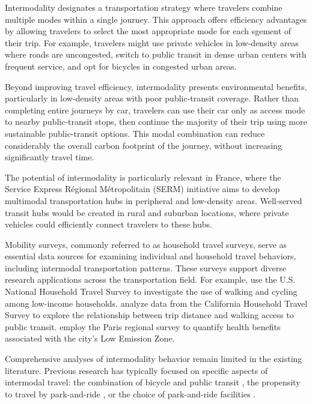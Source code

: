 \documentclass[3p,times,procedia]{elsarticle}
\begin{document}
Intermodality designates a transportation strategy where travelers combine multiple modes within a single journey.
This approach offers efficiency advantages by allowing travelers to select the most appropriate mode for each sgement of their trip.
For example, travelers might use private vehicles in low-density areas where roads are uncongested, switch to public transit in dense urban centers with frequent service, and opt for bicycles in congested urban areas.

Beyond improving travel efficiency, intermodality presents environmental benefits, particularly in low-density areas with poor public-transit coverage.
Rather than completing entire journeys by car, travelers can use their car only as access mode to nearby public-transit stops, then continue the majority of their trip using more sustainable public-transit options.
This modal combination can reduce considerably the overall carbon footprint of the journey, without increasing significantly travel time.

The potential of intermodality is particularly relevant in France, where the Service Express Régional Métropolitain (SERM) initiative aims to develop multimodal transportation hubs in peripheral and low-density areas.
Well-served transit hubs would be created in rural and suburban locations, where private vehicles could efficiently connect travelers to these hubs.

Mobility surveys, commonly referred to as household travel surveys, serve as essential data sources for examining individual and household travel behaviors, including intermodal transportation patterns.
These surveys support diverse research applications across the transportation field.
For example, \citet{Ghimire2024} use the U.S. National Household Travel Survey to investigate the use of walking and cycling among low-income households.
\citet{Durand2016} analyze data from the California Household Travel Survey to explore the relationship between trip distance and walking access to public transit.
\citet{Poulhes2021} employ the Paris regional survey to quantify health benefits associated with the city's Low Emission Zone.

Comprehensive analyses of intermodality behavior remain limited in the existing literature.
Previous research has typically focused on specific aspects of intermodal travel: the combination of bicycle and public transit \citep{Kapuku2024}, the propensity to travel by park-and-ride \citep{Huang2021}, or the choice of park-and-ride facilities \citep{Webb2020,Irawati2022}.
\end{document}
